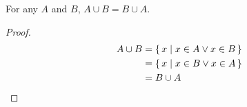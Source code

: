 \guard



\begin{prop}
\label{prop:unionIsCommutative}
  For any $A$ and $B$, $A\cup B = B\cup A$.
\end{prop}
\begin{proof}
  \begin{align*}
    A\cup B &= \left\{\, x\mid x\in A \vee x\in B \,\right\} \\
            &= \left\{\, x\mid x\in B \vee x\in A \,\right\} \\
            &= B\cup A
  \end{align*}
\end{proof}
